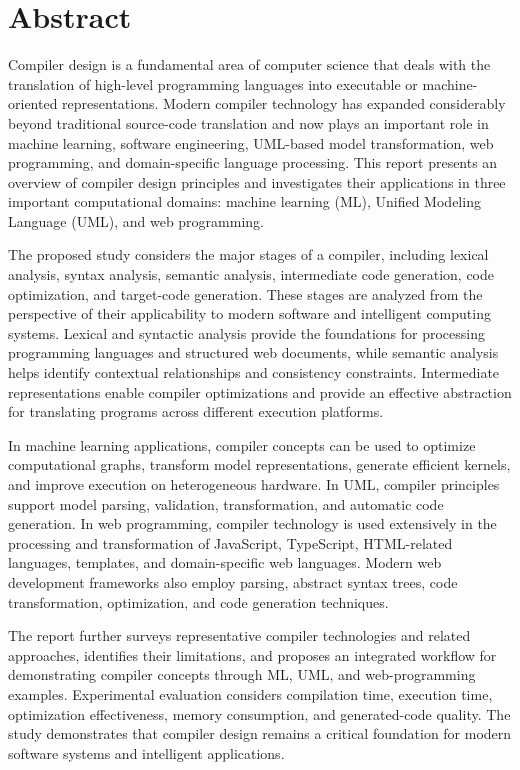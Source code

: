 \documentclass[12pt,a4paper]{article}
\begin{document}
\section*{Abstract}

Compiler design is a fundamental area of computer science that deals with the
translation of high-level programming languages into executable or
machine-oriented representations. Modern compiler technology has expanded
considerably beyond traditional source-code translation and now plays an
important role in machine learning, software engineering, UML-based model
transformation, web programming, and domain-specific language processing.
This report presents an overview of compiler design principles and investigates
their applications in three important computational domains: machine learning
(ML), Unified Modeling Language (UML), and web programming.

The proposed study considers the major stages of a compiler, including lexical
analysis, syntax analysis, semantic analysis, intermediate code generation,
code optimization, and target-code generation. These stages are analyzed from
the perspective of their applicability to modern software and intelligent
computing systems. Lexical and syntactic analysis provide the foundations for
processing programming languages and structured web documents, while semantic
analysis helps identify contextual relationships and consistency constraints.
Intermediate representations enable compiler optimizations and provide an
effective abstraction for translating programs across different execution
platforms.

In machine learning applications, compiler concepts can be used to optimize
computational graphs, transform model representations, generate efficient
kernels, and improve execution on heterogeneous hardware. In UML, compiler
principles support model parsing, validation, transformation, and automatic
code generation. In web programming, compiler technology is used extensively
in the processing and transformation of JavaScript, TypeScript, HTML-related
languages, templates, and domain-specific web languages. Modern web
development frameworks also employ parsing, abstract syntax trees, code
transformation, optimization, and code generation techniques.

The report further surveys representative compiler technologies and related
approaches, identifies their limitations, and proposes an integrated workflow
for demonstrating compiler concepts through ML, UML, and web-programming
examples. Experimental evaluation considers compilation time, execution time,
optimization effectiveness, memory consumption, and generated-code quality.
The study demonstrates that compiler design remains a critical foundation for
modern software systems and intelligent applications.
\end{document}
